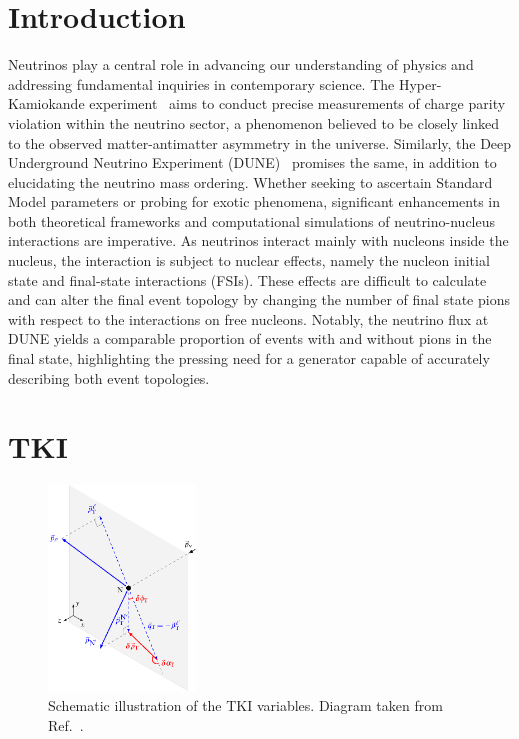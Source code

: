 \section{\label{sec:1-intro}Introduction}

Neutrinos play a central role in advancing our understanding of physics and addressing fundamental inquiries in contemporary science. The Hyper-Kamiokande experiment~\cite{Hyper-Kamiokande:2018ofw} aims to conduct precise measurements of charge parity violation within the neutrino sector, a phenomenon believed to be closely linked to the observed matter-antimatter asymmetry in the universe. Similarly, the Deep Underground Neutrino Experiment (DUNE)~\cite{DUNE:2016hlj,DUNE:2015lol,DUNE:2016evb,DUNE:2016rla,DUNE:2021tad}  promises the same, in addition to elucidating the neutrino mass ordering. Whether seeking to ascertain Standard Model parameters or probing for exotic phenomena, significant enhancements in both theoretical frameworks and computational simulations of neutrino-nucleus interactions are imperative. As neutrinos interact mainly with nucleons inside the nucleus, the interaction is subject to nuclear effects, namely the nucleon initial state and final-state interactions (FSIs). These effects are difficult to calculate and can alter the final event topology by changing the number of final state pions with respect to the interactions on free nucleons. Notably, the neutrino flux at DUNE yields a comparable proportion of events with and without pions in the final state, highlighting the pressing need for a generator capable of accurately describing both event topologies.


\section{TKI}
\label{sec:nuint-tki}

\begin{figure}[!htb] 	
    \centering 		
    \includegraphics[width=0.35\textwidth]{figures/stki.eps}
    \caption{\label{fig:stki} Schematic illustration of the TKI variables. Diagram taken from Ref.~\cite{Lu:2015tcr}.} 
\end{figure}

